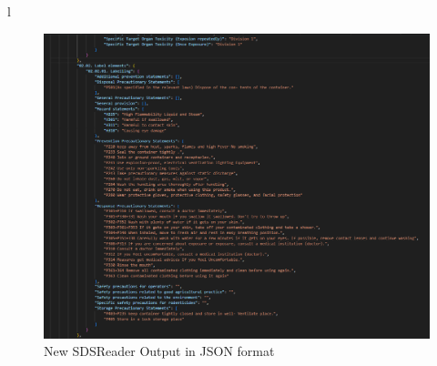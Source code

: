 l\documentclass[a4paper,12pt,twoside]{report}
\begin{document}
\begin{figure}[H]
		\includegraphics[width=\textwidth, keepaspectratio ]{images/newSDSReader}
	\caption[Old SDSReader]{New SDSReader Output in JSON format}
\label{newSDSReader}
\end{figure}
\end{document}
